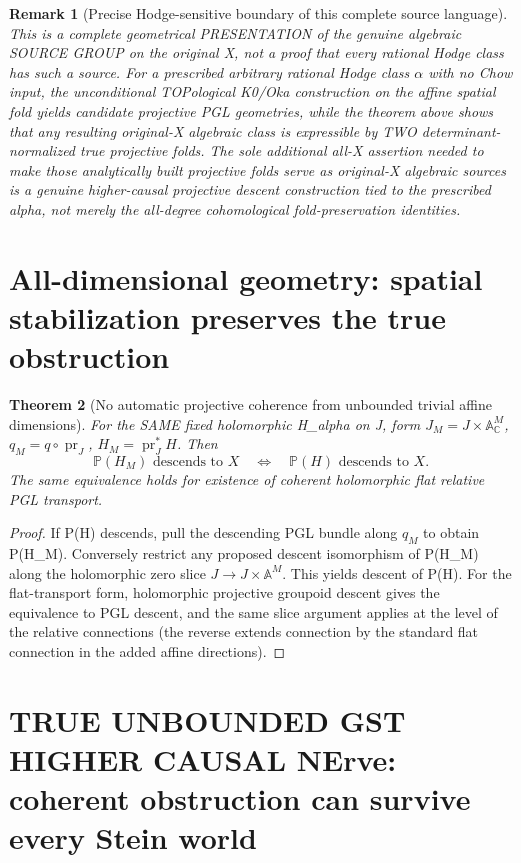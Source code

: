 \documentclass[11pt]{article}
\newtheorem{theorem}{Theorem}
\newtheorem{remark}[theorem]{Remark}
\begin{document}
\begin{remark}[Precise Hodge-sensitive boundary of this complete source language]
This is a complete geometrical \emph{PRESENTATION}
of the genuine algebraic SOURCE GROUP on the original X,
not a proof that every rational Hodge class has
such a source. For a prescribed arbitrary rational
Hodge class $\alpha$ with no Chow input, the
unconditional TOPological K0/Oka construction on
the affine spatial fold yields candidate
projective PGL geometries, while the theorem
above shows that any resulting original-X
algebraic class is expressible by TWO
determinant-normalized true projective folds.
The sole additional all-X assertion needed
to make those analytically built projective folds
serve as original-X algebraic sources is a
genuine higher-causal projective descent
construction tied to the prescribed alpha,
not merely the all-degree cohomological
fold-preservation identities.
\end{remark}

\section{All-dimensional geometry: spatial stabilization preserves the true obstruction}
\begin{theorem}[No automatic projective coherence from unbounded trivial affine dimensions]
For the SAME fixed holomorphic
H_alpha on J, form
$J_M=J\times\mathbb A_\mathbb C^M$,
$q_M=q\circ\operatorname{pr}_J$,
$H_M=\operatorname{pr}_J^*H$.
Then
\[
 \boxed{
 \mathbb P(H_M)\text{ descends to }X
 \quad\Longleftrightarrow\quad
 \mathbb P(H)\text{ descends to }X.
 }
                                                             \tag{11}
\]
The same equivalence holds for
existence of coherent holomorphic
flat relative PGL transport.
\end{theorem}
\begin{proof}
If P(H) descends, pull the
descending PGL bundle along
$q_M$ to obtain P(H_M).
Conversely restrict any proposed
descent isomorphism of P(H_M)
along the holomorphic zero slice
$J\to J\times\mathbb A^M$.
This yields descent of P(H).
For the flat-transport form,
holomorphic projective
groupoid descent gives the
equivalence to PGL descent,
and the same slice argument
applies at the level of
the relative connections
(the reverse extends connection
by the standard flat connection
in the added affine directions).
\end{proof}

\section{TRUE UNBOUNDED GST HIGHER CAUSAL NErve: coherent obstruction can survive every Stein world}
\end{document}
